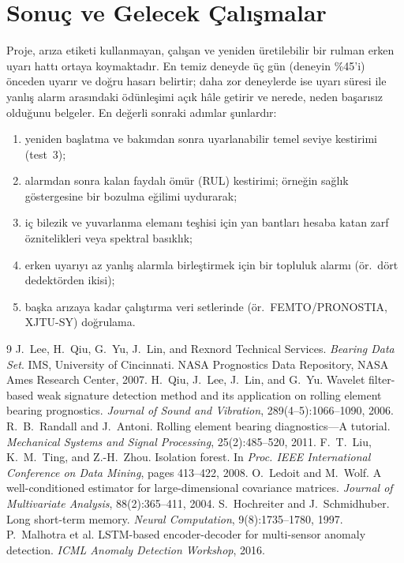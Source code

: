 \documentclass[11pt]{article}
\begin{document}
\section{Sonuç ve Gelecek Çalışmalar}
Proje, arıza etiketi kullanmayan, çalışan ve yeniden üretilebilir bir rulman erken uyarı hattı ortaya
koymaktadır. En temiz deneyde üç gün (deneyin \%45'i) önceden uyarır ve doğru hasarı belirtir; daha zor
deneylerde ise uyarı süresi ile yanlış alarm arasındaki ödünleşimi açık hâle getirir ve nerede, neden
başarısız olduğunu belgeler. En değerli sonraki adımlar şunlardır:
\begin{enumerate}
  \item yeniden başlatma ve bakımdan sonra uyarlanabilir temel seviye kestirimi (test~3);
  \item alarmdan sonra kalan faydalı ömür (RUL) kestirimi; örneğin sağlık göstergesine bir bozulma
        eğilimi uydurarak;
  \item iç bilezik ve yuvarlanma elemanı teşhisi için yan bantları hesaba katan zarf öznitelikleri veya
        spektral basıklık;
  \item erken uyarıyı az yanlış alarmla birleştirmek için bir topluluk alarmı (ör.\ dört dedektörden
        ikisi);
  \item başka arızaya kadar çalıştırma veri setlerinde (ör.\ FEMTO/PRONOSTIA, XJTU-SY) doğrulama.
\end{enumerate}

\begin{thebibliography}{9}
 J.~Lee, H.~Qiu, G.~Yu, J.~Lin, and Rexnord Technical Services.
  \emph{Bearing Data Set}. IMS, University of Cincinnati. NASA Prognostics Data Repository, NASA Ames
  Research Center, 2007.
 H.~Qiu, J.~Lee, J.~Lin, and G.~Yu. Wavelet filter-based weak signature detection
  method and its application on rolling element bearing prognostics. \emph{Journal of Sound and
  Vibration}, 289(4--5):1066--1090, 2006.
 R.~B.~Randall and J.~Antoni. Rolling element bearing diagnostics---A tutorial.
  \emph{Mechanical Systems and Signal Processing}, 25(2):485--520, 2011.
 F.~T.~Liu, K.~M.~Ting, and Z.-H.~Zhou. Isolation forest. In \emph{Proc. IEEE
  International Conference on Data Mining}, pages 413--422, 2008.
 O.~Ledoit and M.~Wolf. A well-conditioned estimator for large-dimensional
  covariance matrices. \emph{Journal of Multivariate Analysis}, 88(2):365--411, 2004.
 S.~Hochreiter and J.~Schmidhuber. Long short-term memory. \emph{Neural
  Computation}, 9(8):1735--1780, 1997.
 P.~Malhotra et al. LSTM-based encoder-decoder for multi-sensor anomaly
  detection. \emph{ICML Anomaly Detection Workshop}, 2016.
\end{thebibliography}
\end{document}
